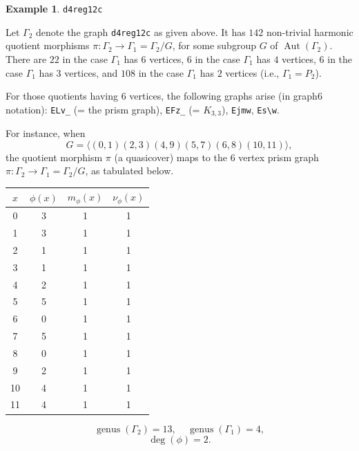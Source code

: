 \documentclass[12pt,letterpaper]{article}
\theoremstyle{definition}
\newtheorem{example}[theorem]{Example}
\DeclareMathOperator{\Aut}{Aut}
\DeclareMathOperator{\genus}{genus}
\begin{document}
\begin{example}%
\label{example:d4reg12c}
 {\tt d4reg12c}\newline
{\rm  
  Let $\Gamma_2$ denote the graph {\tt d4reg12c} as given above.
It has $142$  non-trivial harmonic quotient morphisms
$\pi: \Gamma_2\to \Gamma_1=\Gamma_2/G$,
for some subgroup $G$ of $\Aut(\Gamma_2)$.
There are $22$ in the case $\Gamma_1$ has $6$ vertices,
$6$ in the case $\Gamma_1$ has $4$ vertices,
$6$ in the case $\Gamma_1$ has $3$ vertices,
and  $108$ in the case $\Gamma_1$ has $2$ vertices
(i.e., $\Gamma_1=P_2$).

For those quotients having $6$ vertices, the following graphs arise
(in graph6 notation): \verb+ELv_+ (= the prism graph),
\verb+EFz_+ (= $K_{3,3}$), \verb+Ejmw+, \verb+Es\w+. 

For instance, when
\[
G = \langle (0,1)(2,3)(4,9)(5,7)(6,8)(10,11) \rangle ,
\]
the quotient morphism $\pi$ (a quasicover) maps to the $6$ vertex prism graph
$\pi: \Gamma_2\to \Gamma_1=\Gamma_2/G $, as tabulated below.

\begin{center}
\begin{tabular}{c|c|c|c}  
  $x$ & $\phi(x)$ & $m_\phi(x)$ & $\nu_\phi(x)$ \\ \hline
  0   &    3   &        1         &  1   \\ 
  1   &    3   &        1         &  1  \\ 
  2   &    1   &        1         &  1  \\ 
  3   &    1   &        1         &  1  \\ 
  4   &    2   &        1         &  1   \\
  5   &    5   &        1         &  1   \\
  6   &    0   &        1         &  1   \\
  7   &    5   &        1         &  1   \\
  8   &    0   &        1         &  1   \\
  9   &    2   &        1         &  1   \\
  10   &   4   &        1         &  1  \\   
  11   &   4   &        1         &  1  \\
\end{tabular}
\end{center}

\[
  \genus(\Gamma_2) =13,\ \ \ \ \
  \genus(\Gamma_1) =4,
\]
\[
\deg(\phi) =2.
\]

}
\end{example}
\end{document}
